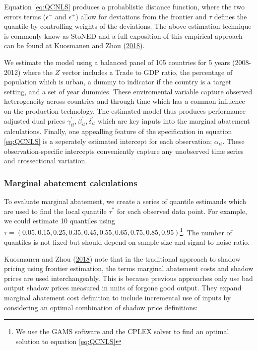 \documentclass[12pt,]{article}
\begin{document}
Equation \eqref{eq:QCNLS} produces a probablistic distance function, where the two errors terms (\(\epsilon^-\) and \(\epsilon^+\)) allow for deviations from the frontier and \(\tau\) defines the quantile by controlling weights of the deviations. The above estimation technique is commonly know as StoNED and a full exposition of this empirical approach can be found at Kuosmanen and Zhou (\protect\hyperlink{ref-Kuosmanen2018b}{2018}).

We estimate the model using a balanced panel of 105 countries for 5 years (2008-2012) where the \(Z\) vector includes a Trade to GDP ratio, the percentage of population which is urban, a dummy to indicator if the country is a target setting, and a set of year dummies. These enviromental variable capture observed heterogeneity across countries and through time which has a common influence on the production technology. The estimated model thus produces performance adjusted dual prices \(\gamma^{'}_{it},\beta^{'}_{it} ,\delta^{'}_{it}\) which are key inputs into the marginal abatement calculations. Finally, one appealling feature of the specification in equation \eqref{eq:QCNLS} is a seperately estimated intercept for each observation; \(\alpha_{it}\). These observation-specific intercepts conveniently capture any unobserved time series and crossectional variation.

\hypertarget{marginal-abatement-calculations}{%
\subsubsection{Marginal abatement calculations}\label{marginal-abatement-calculations}}

To evaluate marginal abatement, we create a series of quantile estimands which are used to find the local quantile \(\tau^{*}\) for each observed data point. For example, we could estimate 10 quantiles using \(\tau=(0.05,0.15,0.25,0.35,0.45,0.55,0.65,0.75,0.85,0.95)\)\footnote{We use the GAMS software and the CPLEX solver to find an optimal solution to equation \eqref{eq:QCNLS}}. The number of quantiles is not fixed but should depend on sample size and signal to noise ratio.

Kuosmanen and Zhou (\protect\hyperlink{ref-Kuosmanen2018b}{2018}) note that in the traditional approach to shadow pricing using frontier estimation, the terms marginal abatement costs and shadow prices are used interchangeably. This is because previous approaches only use bad output shadow prices measured in units of forgone good output. They expand marginal abatement cost definition to include incremental use of inputs by considering an optimal combination of shadow price definitions:
\end{document}
